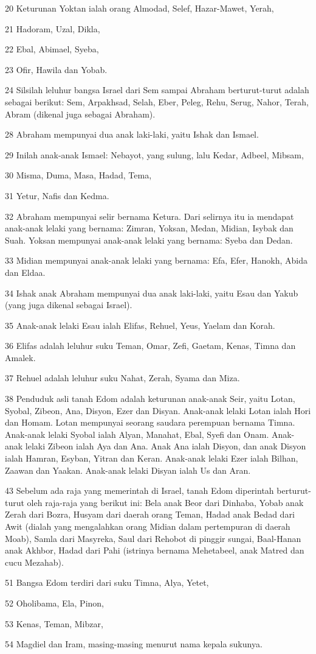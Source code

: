 \par 20 Keturunan Yoktan ialah orang Almodad, Selef, Hazar-Mawet, Yerah,
\par 21 Hadoram, Uzal, Dikla,
\par 22 Ebal, Abimael, Syeba,
\par 23 Ofir, Hawila dan Yobab.
\par 24 Silsilah leluhur bangsa Israel dari Sem sampai Abraham berturut-turut adalah sebagai berikut: Sem, Arpakhsad, Selah, Eber, Peleg, Rehu, Serug, Nahor, Terah, Abram (dikenal juga sebagai Abraham).
\par 28 Abraham mempunyai dua anak laki-laki, yaitu Ishak dan Ismael.
\par 29 Inilah anak-anak Ismael: Nebayot, yang sulung, lalu Kedar, Adbeel, Mibsam,
\par 30 Misma, Duma, Masa, Hadad, Tema,
\par 31 Yetur, Nafis dan Kedma.
\par 32 Abraham mempunyai selir bernama Ketura. Dari selirnya itu ia mendapat anak-anak lelaki yang bernama: Zimran, Yoksan, Medan, Midian, Isybak dan Suah. Yoksan mempunyai anak-anak lelaki yang bernama: Syeba dan Dedan.
\par 33 Midian mempunyai anak-anak lelaki yang bernama: Efa, Efer, Hanokh, Abida dan Eldaa.
\par 34 Ishak anak Abraham mempunyai dua anak laki-laki, yaitu Esau dan Yakub (yang juga dikenal sebagai Israel).
\par 35 Anak-anak lelaki Esau ialah Elifas, Rehuel, Yeus, Yaelam dan Korah.
\par 36 Elifas adalah leluhur suku Teman, Omar, Zefi, Gaetam, Kenas, Timna dan Amalek.
\par 37 Rehuel adalah leluhur suku Nahat, Zerah, Syama dan Miza.
\par 38 Penduduk asli tanah Edom adalah keturunan anak-anak Seir, yaitu Lotan, Syobal, Zibeon, Ana, Disyon, Ezer dan Disyan. Anak-anak lelaki Lotan ialah Hori dan Homam. Lotan mempunyai seorang saudara perempuan bernama Timna. Anak-anak lelaki Syobal ialah Alyan, Manahat, Ebal, Syefi dan Onam. Anak-anak lelaki Zibeon ialah Aya dan Ana. Anak Ana ialah Disyon, dan anak Disyon ialah Hamran, Esyban, Yitran dan Keran. Anak-anak lelaki Ezer ialah Bilhan, Zaawan dan Yaakan. Anak-anak lelaki Disyan ialah Us dan Aran.
\par 43 Sebelum ada raja yang memerintah di Israel, tanah Edom diperintah berturut-turut oleh raja-raja yang berikut ini: Bela anak Beor dari Dinhaba, Yobab anak Zerah dari Bozra, Husyam dari daerah orang Teman, Hadad anak Bedad dari Awit (dialah yang mengalahkan orang Midian dalam pertempuran di daerah Moab), Samla dari Masyreka, Saul dari Rehobot di pinggir sungai, Baal-Hanan anak Akhbor, Hadad dari Pahi (istrinya bernama Mehetabeel, anak Matred dan cucu Mezahab).
\par 51 Bangsa Edom terdiri dari suku Timna, Alya, Yetet,
\par 52 Oholibama, Ela, Pinon,
\par 53 Kenas, Teman, Mibzar,
\par 54 Magdiel dan Iram, masing-masing menurut nama kepala sukunya.

